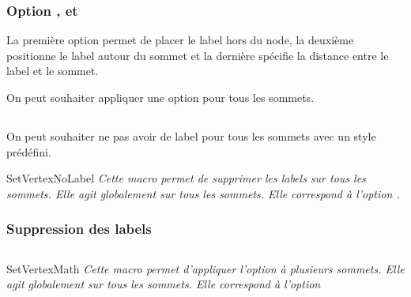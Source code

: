 \subsubsection{Option ,  et }

La première option permet de placer le label hors du node, la deuxième positionne le label autour du sommet et la dernière spécifie la distance entre le label et le sommet.

\begin{tkzexample}[latex=7cm,small]
\end{tkzexample}  


\vfill\newpage 
On peut souhaiter appliquer une option pour tous les sommets.  

\subsection{}
On peut souhaiter ne pas avoir de label pour tous les sommets avec un style prédéfini. 

\begin{NewMacroBox}{SetVertexNoLabel}{}
\emph{ Cette macro permet de supprimer les labels sur tous les sommets. Elle agit globalement sur tous les sommets. Elle correspond à l'option  .}
\end{NewMacroBox}
 
\subsubsection{Suppression des labels} 

\begin{tkzexample}[vbox]
\end{tkzexample}   


\subsection{ } 
\begin{NewMacroBox}{SetVertexMath}{}
\emph{Cette macro permet d'appliquer l'option  à plusieurs  sommets. Elle agit globalement sur tous les sommets. Elle correspond à l'option  }
\end{NewMacroBox}


